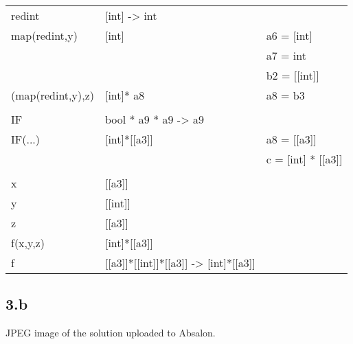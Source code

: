 \documentclass[11pt,a4paper]{article}
\begin{document}
\begin{tabular}{l l l}
    redint              & [int] -> int                                  & \\
    map(redint,y)       & [int]                                         & a6 = [int]   \\
                        &                                               & a7 = int \\
                        &                                               & b2 = [[int]] \\
    (map(redint,y),z)   & [int]*  a8                                    & a8 = b3\\
                        &                                               & \\ \hline
    IF                  & bool * a9 * a9 -> a9                          & \\ 
    IF(...)             & [int]*[[a3]]                                  & a8 = [[a3]] \\
                        &                                               & c = [int] * [[a3]]\\
                        &                                               & \\ \hline
    x                   & [[a3]]                                        & \\
    y                   & [[int]]                                       & \\
    z                   & [[a3]]                                        & \\
    f(x,y,z)            & [int]*[[a3]]                                  & \\
    f                   & [[a3]]*[[int]]*[[a3]] -> [int]*[[a3]]         &
\end{tabular}
\subsection{3.b}
JPEG image of the solution uploaded to Absalon.
\end{document}
